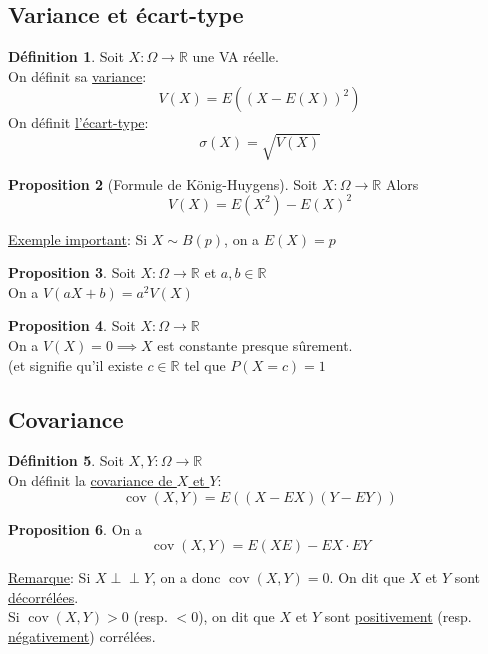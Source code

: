 \documentclass[10pt,a4paper]{article}
\theoremstyle{definition}
\newtheorem{proposition}{Proposition}[section]
\newtheorem{definition}[proposition]{Définition}
\DeclareMathOperator{\cov}{cov}
\newcommand{\indep}{\mathrel{\perp \!\!\! \perp}}
\begin{document}
\subsection{Variance et écart-type}
\begin{definition}
Soit $X: \Omega \to \mathbb{R}$ une VA réelle. \\
On définit sa \uline{variance}:
\[ V(X) = E((X - E(X))^2) \]
On définit \uline{l'écart-type}:
\[ \sigma(X) = \sqrt{V(X)} \]
\end{definition}
\begin{proposition}[Formule de König-Huygens]
Soit $X: \Omega \to \mathbb{R}$
Alors
\[ V(X) = E(X^2) - E(X)^2 \]
\end{proposition}
\noindent \uline{Exemple important}: Si $X \sim B(p)$, on a $E(X) = p$
\begin{proposition}
Soit $X: \Omega \to \mathbb{R}$ et $a, b \in \mathbb{R}$ \\
On a $V(aX + b) = a^2 V(X)$
\end{proposition}
\begin{proposition}
Soit $X: \Omega \to \mathbb{R}$ \\
On a $V(X) = 0 \implies X$ est constante presque sûrement. \\
(et signifie qu'il existe $c \in \mathbb{R}$ tel que $P(X = c) = 1$
\end{proposition}

\subsection{Covariance}
\begin{definition}
Soit $X, Y: \Omega \to \mathbb{R}$ \\
On définit la \uline{covariance de $X$ et $Y$}: 
\[ \cov(X, Y) = E\left((X - EX)(Y - EY)\right) \]
\end{definition}
\begin{proposition}
On a
\[ \cov(X, Y) = E(XE) - EX \cdot EY \]
\end{proposition}
\noindent \uline{Remarque}: Si $X \indep Y$, on a donc $\cov(X, Y) = 0$. On dit que $X$ et $Y$ sont \uline{décorrélées}. \\
Si $\cov(X, Y) > 0$ (resp. $< 0$), on dit que $X$ et $Y$ sont \uline{positivement} (resp. \uline{négativement}) corrélées. \medskip
\end{document}
